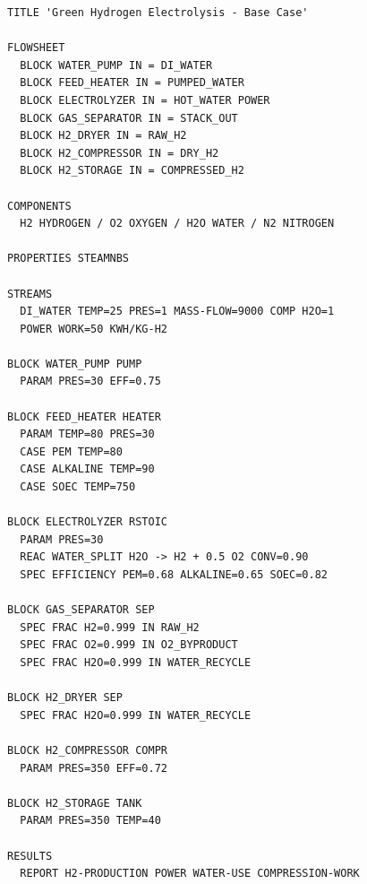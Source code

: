 \documentclass[12pt,twoside,openany]{book}
\begin{document}
\begin{lstlisting}[language={}, caption={Electrolysis\_BaseCase.apw (complete)}]
TITLE 'Green Hydrogen Electrolysis - Base Case'

FLOWSHEET
  BLOCK WATER_PUMP IN = DI_WATER
  BLOCK FEED_HEATER IN = PUMPED_WATER
  BLOCK ELECTROLYZER IN = HOT_WATER POWER
  BLOCK GAS_SEPARATOR IN = STACK_OUT
  BLOCK H2_DRYER IN = RAW_H2
  BLOCK H2_COMPRESSOR IN = DRY_H2
  BLOCK H2_STORAGE IN = COMPRESSED_H2

COMPONENTS
  H2 HYDROGEN / O2 OXYGEN / H2O WATER / N2 NITROGEN

PROPERTIES STEAMNBS

STREAMS
  DI_WATER TEMP=25 PRES=1 MASS-FLOW=9000 COMP H2O=1
  POWER WORK=50 KWH/KG-H2

BLOCK WATER_PUMP PUMP
  PARAM PRES=30 EFF=0.75

BLOCK FEED_HEATER HEATER
  PARAM TEMP=80 PRES=30
  CASE PEM TEMP=80
  CASE ALKALINE TEMP=90
  CASE SOEC TEMP=750

BLOCK ELECTROLYZER RSTOIC
  PARAM PRES=30
  REAC WATER_SPLIT H2O -> H2 + 0.5 O2 CONV=0.90
  SPEC EFFICIENCY PEM=0.68 ALKALINE=0.65 SOEC=0.82

BLOCK GAS_SEPARATOR SEP
  SPEC FRAC H2=0.999 IN RAW_H2
  SPEC FRAC O2=0.999 IN O2_BYPRODUCT
  SPEC FRAC H2O=0.999 IN WATER_RECYCLE

BLOCK H2_DRYER SEP
  SPEC FRAC H2O=0.999 IN WATER_RECYCLE

BLOCK H2_COMPRESSOR COMPR
  PARAM PRES=350 EFF=0.72

BLOCK H2_STORAGE TANK
  PARAM PRES=350 TEMP=40

RESULTS
  REPORT H2-PRODUCTION POWER WATER-USE COMPRESSION-WORK
\end{lstlisting}
\end{document}
